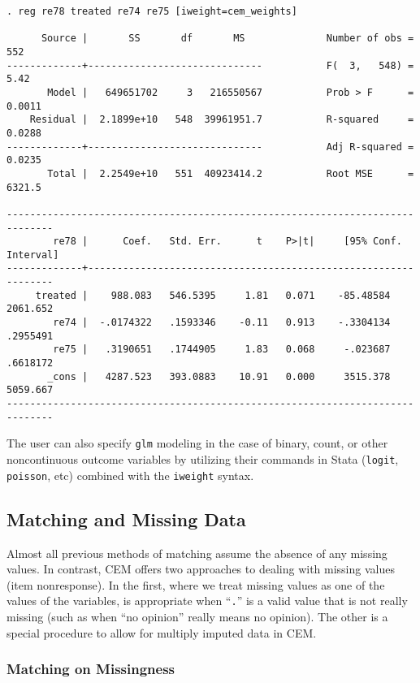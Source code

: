 \documentclass[11pt,titlepage]{article}
\begin{document}
\begin{verbatim}
. reg re78 treated re74 re75 [iweight=cem_weights]

      Source |       SS       df       MS              Number of obs =     552
-------------+------------------------------           F(  3,   548) =    5.42
       Model |   649651702     3   216550567           Prob > F      =  0.0011
    Residual |  2.1899e+10   548  39961951.7           R-squared     =  0.0288
-------------+------------------------------           Adj R-squared =  0.0235
       Total |  2.2549e+10   551  40923414.2           Root MSE      =  6321.5

------------------------------------------------------------------------------
        re78 |      Coef.   Std. Err.      t    P>|t|     [95% Conf. Interval]
-------------+----------------------------------------------------------------
     treated |    988.083   546.5395     1.81   0.071    -85.48584    2061.652
        re74 |  -.0174322   .1593346    -0.11   0.913    -.3304134    .2955491
        re75 |   .3190651   .1744905     1.83   0.068     -.023687    .6618172
       _cons |   4287.523   393.0883    10.91   0.000     3515.378    5059.667
------------------------------------------------------------------------------

\end{verbatim}


The user can also specify \texttt{glm} modeling in the case of binary,
count, or other noncontinuous outcome variables by utilizing their
commands in Stata (\texttt{logit},\texttt{ poisson}, etc) combined with the
\texttt{iweight} syntax.

\subsection{Matching and Missing Data}\label{s:mv}

Almost all previous methods of matching assume the absence of any missing
values.  In contrast, CEM offers two approaches to dealing with
missing values (item nonresponse).  In the first, where we treat missing
values as one of the values of the variables, is appropriate when
``\texttt{.}'' is a valid value that is not really missing (such as when
``no opinion'' really means no opinion).  The other is a special procedure
to allow for multiply imputed data in CEM.

\subsubsection{Matching on Missingness}\label{s:mvdirect}
\end{document}
